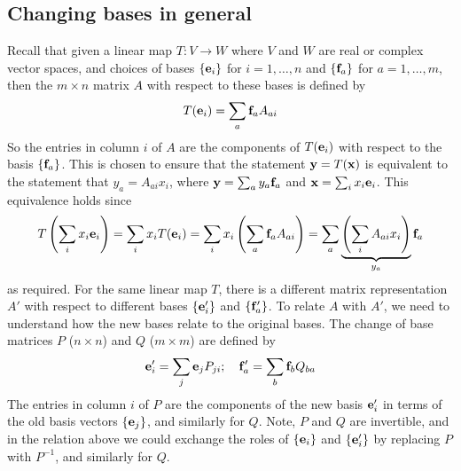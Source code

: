 \subsection{Changing bases in general}
Recall that given a linear map \(T\colon V \to W\) where \(V\) and \(W\) are real or complex vector spaces, and choices of bases \(\{ \vb e_i \}\) for \(i = 1, \dots, n\) and \(\{\vb f_a \}\) for \(a = 1, \dots, m\), then the \(m \times n\) matrix \(A\) with respect to these bases is defined by
\[
	T(\vb e_i) = \sum_a \vb f_a A_{ai}
\]
So the entries in column \(i\) of \(A\) are the components of \(T(\vb e_i)\) with respect to the basis \(\{ \vb f_a \}\).
This is chosen to ensure that the statement \(\vb y = T(\vb x)\) is equivalent to the statement that \(y_a = A_{ai}x_i\), where \(\vb y = \sum_a y_a \vb f_a\) and \(\vb x = \sum_i x_i \vb e_i\).
This equivalence holds since
\[
	T\left(\sum_i x_i \vb e_i \right) = \sum_i x_i T(\vb e_i) = \sum_i x_i \left( \sum_a \vb f_a A_{ai} \right) = \sum_a \underbrace{\left( \sum_i A_{ai} x_i \right)}_{y_a} \vb f_a
\]
as required.
For the same linear map \(T\), there is a different matrix representation \(A'\) with respect to different bases \(\{ \vb e'_i \}\) and \(\{ \vb f'_a \}\).
To relate \(A\) with \(A'\), we need to understand how the new bases relate to the original bases.
The change of base matrices \(P\) (\(n \times n\)) and \(Q\) (\(m \times m\)) are defined by
\[
	\vb e_i' = \sum_j \vb e_j P_{ji};\quad \vb f_a' = \sum_b \vb f_b Q_{ba}
\]
The entries in column \(i\) of \(P\) are the components of the new basis \(\vb e_i'\) in terms of the old basis vectors \(\{ \vb e_j \}\), and similarly for \(Q\).
Note, \(P\) and \(Q\) are invertible, and in the relation above we could exchange the roles of \(\{ \vb e_i \}\) and \(\{ \vb e'_i \}\) by replacing \(P\) with \(P^{-1}\), and similarly for \(Q\).

